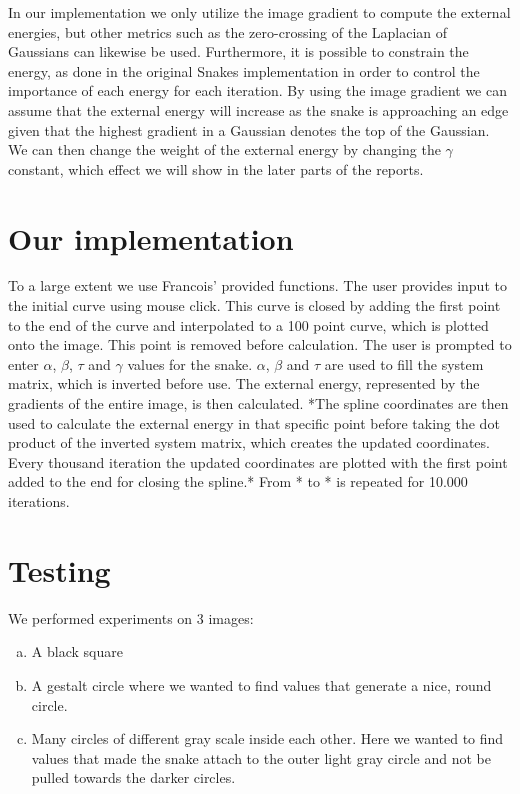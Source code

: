 \documentclass[paper=a4, fontsize=11pt]{scrartcl} %
\numberwithin{equation}{section} %
\numberwithin{figure}{section} %
\numberwithin{table}{section} %
\begin{document}
In our implementation we only utilize the image gradient to compute the external energies, but other metrics such as the zero-crossing of the Laplacian of Gaussians can likewise be used. Furthermore, it is possible to constrain the energy, as done in the original Snakes implementation in order to control the importance of each energy for each iteration. By using the image gradient we can assume that the external energy will increase as the snake is approaching an edge given that the highest gradient in a Gaussian denotes the top of the Gaussian. We can then change the weight of the external energy by changing the $\gamma$ constant, which effect we will show in the later parts of the reports.
\

\section{Our implementation}
To a large extent we use Francois' provided functions. The user provides input to the initial curve using mouse click. This curve is closed by adding the first point to the end of the curve and interpolated to a 100 point curve, which is plotted onto the image. This point is removed before calculation. The user is prompted to enter $\alpha$, $\beta$, $\tau$ and $\gamma$ values for the snake. $\alpha$, $\beta$ and $\tau$ are used to fill the system matrix, which is inverted before use. The external energy, represented by the gradients of the entire image, is then calculated. *The spline coordinates are then used to calculate the external energy in that specific point before taking the dot product of the inverted system matrix, which creates the updated coordinates. Every thousand iteration the updated coordinates are plotted with the first point added to the end for closing the spline.* From * to * is repeated for 10.000 iterations. 
\

\section{Testing}
We performed experiments on 3 images:
\
\begin{enumerate}[(a)]
\item A black square
\item A gestalt circle where we wanted to find values that generate a nice, round circle.
\item Many circles of different gray scale inside each other. Here we wanted to find values that made the snake attach to the outer light gray circle and not be pulled towards the darker circles.
\end{enumerate}
\end{document}
